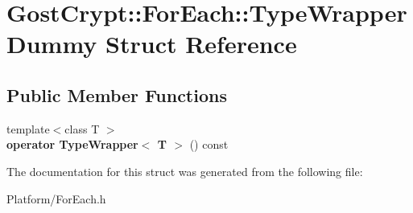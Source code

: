 \hypertarget{struct_gost_crypt_1_1_for_each_1_1_type_wrapper_dummy}{}\section{Gost\+Crypt\+:\+:For\+Each\+:\+:Type\+Wrapper\+Dummy Struct Reference}
\label{struct_gost_crypt_1_1_for_each_1_1_type_wrapper_dummy}
\subsection*{Public Member Functions}
\begin{DoxyCompactItemize}
\item 
\mbox{\label{struct_gost_crypt_1_1_for_each_1_1_type_wrapper_dummy_a6a7179189eaa969f57b7e2369bdc0be6}} 
{\footnotesize template$<$class T $>$ }\\{\bfseries operator Type\+Wrapper$<$ T $>$} () const
\end{DoxyCompactItemize}


The documentation for this struct was generated from the following file\+:\begin{DoxyCompactItemize}
\item 
Platform/For\+Each.\+h\end{DoxyCompactItemize}
